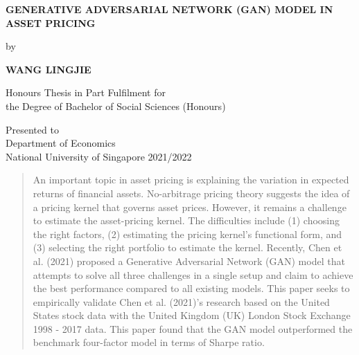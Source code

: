 \documentclass[12pt]{article}
\begin{document}
\begin{titlepage}
    \begin{center}
        \vspace*{1cm}

                    \large{\textbf{\uppercase{Generative Adversarial Network (GAN) model in Asset Pricing}}}
        
        \vfill

        by

                    \textbf{\uppercase{Wang Lingjie}}
        
        \vfill

        Honours Thesis in Part Fulfilment for\\
        the Degree of Bachelor of Social Sciences (Honours)

        \vspace{0.8cm}


        Presented to\\
        Department of Economics\\
        National University of Singapore 2021/2022

    \end{center}
\end{titlepage}

\fancyfoot[C]{\thepage}
\setlength{\headheight}{15pt}

\newpage
\renewcommand{\abstractname}{\underline{\uppercase{acknowledgement}}}

            
    
\newpage


\renewcommand{\abstractname}{\underline{\uppercase{abstract}}}

\newpage
    \begin{centering}

                \begin{abstract}
            An important topic in asset pricing is explaining the variation in expected returns of financial assets. No-arbitrage pricing theory suggests the idea of a pricing kernel that governs asset prices. However, it remains a challenge to estimate the asset-pricing kernel. The difficulties include (1) choosing the right factors, (2) estimating the pricing kernel's functional form, and (3) selecting the right portfolio to estimate the kernel. Recently, Chen et al. (2021) proposed a Generative Adversarial Network (GAN) model that attempts to solve all three challenges in a single setup and claim to achieve the best performance compared to all existing models. This paper seeks to empirically validate Chen et al. (2021)'s research based on the United States stock data with the United Kingdom (UK) London Stock Exchange 1998 - 2017 data. This paper found that the GAN model outperformed the benchmark four-factor model in terms of Sharpe ratio.
        \end{abstract}

        

    \end{centering}
\end{document}
